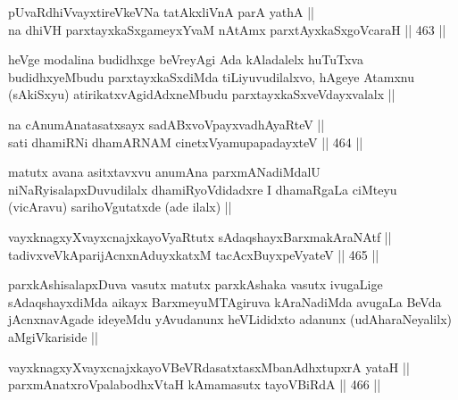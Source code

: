 
\begin{shl}
pUvaRdhiVvayxtireVkeVNa tatAkxliVnA parA yathA || \\
na dhiVH parxtayxkaSxgameyxYvaM nA\s \s tAmx parxtAyxkaSxgoVcaraH ||  463 ||  
\end{shl}

\begin{artha}
heVge modalina budidhxge beVreyAgi Ada kAladalelx huTuTxva budidhxyeMbudu parxtayxkaSxdiMda tiLiyuvudilalxvo, hAgeye Atamxnu (sAkiSxyu) atirikatxvAgidAdxneMbudu parxtayxkaSxveVdayxvalalx ||
\end{artha}

\begin{shl}
na cAnumAnatasatxsayx sadABxvoV\s payxvadhAyaRteV ||  \\
sati dhamiRNi dhamARNAM cinetxVyamupapadayxteV ||  464 ||  
\end{shl}

\begin{artha}
matutx avana asitxtavxvu anumAna parxmANadiMdalU niNaRyisalapxDuvudilalx dhamiRyoVdidadxre I dhamaRgaLa ciMteyu (vicAravu) sarihoVgutatxde (ade ilalx) ||
\end{artha}

\begin{shl}
vayxknagxyXvayxcnajxkayoVyaRtutx sAdaqshayxBarxmakAraNAtf || \\
tadivxveVkAparijAcnxnAduyxkatxM tacAcxBuyxpeVyateV ||  465 ||  
\end{shl}

\begin{artha}
parxkAshisalapxDuva vasutx matutx parxkAshaka vasutx ivugaLige sAdaqshayxdiMda aikayx BarxmeyuMTAgiruva kAraNadiMda avugaLa BeVda jAcnxnavAgade ideyeMdu yAvudanunx heVLididxto adanunx (udAharaNeyalilx) aMgiVkariside ||
\end{artha}


\begin{shl}
vayxknagxyXvayxcnajxkayoVBeVRdasatxtasxMbanAdhxtupxrA yataH || \\
parxmAnatxroVpalabodhxV\s taH kAmamasutx tayoVBiRdA ||  466 ||  
\end{shl}

